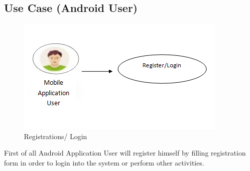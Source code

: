 \newpage
\subsection{Use Case (Android User)}
\begin{figure}[H]
    \centering
    \includegraphics{31UseCase}
		\caption{Registrations/ Login}
\end{figure}
First of all Android Application User will register himself by filling registration form in order to login into the system or perform other activities.
